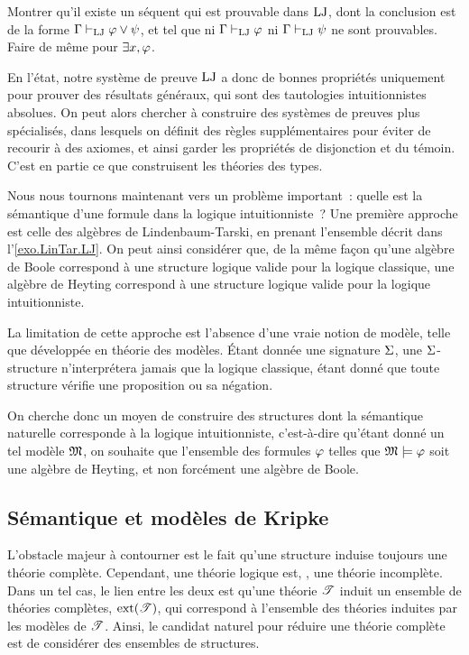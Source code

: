 \begin{exercise}
  Montrer qu'il existe un séquent qui est prouvable dans $\operatorname{LJ}$, dont la
  conclusion est de la forme $\Gamma\vdash_{\operatorname{LJ}}\varphi\lor \psi$, et tel que
  ni $\Gamma\vdash_{\operatorname{LJ}}\varphi$ ni $\Gamma\vdash_{\operatorname{LJ}}\psi$ ne sont prouvables.
  Faire de même pour $\exists x, \varphi$.
\end{exercise}

En l'état, notre système de preuve $\operatorname{LJ}$ a donc de bonnes propriétés uniquement
pour prouver des résultats généraux, qui sont des tautologies intuitionnistes
absolues. On peut alors chercher à construire des systèmes de preuves plus
spécialisés, dans lesquels on définit des règles supplémentaires pour éviter
de recourir à des axiomes, et ainsi garder les propriétés de disjonction et du
témoin. C'est en partie ce que construisent les théories des types.

Nous nous tournons maintenant vers un problème important~: quelle est la
sémantique d'une formule dans la logique intuitionniste~? Une première approche
est celle des algèbres de Lindenbaum-Tarski, en prenant l'ensemble décrit dans
l'\cref{exo.LinTar.LJ}. On peut ainsi considérer que, de la même façon qu'une
algèbre de Boole correspond à une structure logique valide pour la logique
classique, une algèbre de Heyting correspond à une structure logique valide
pour la logique intuitionniste.

La limitation de cette approche est l'absence d'une vraie notion de modèle,
telle que développée en théorie des modèles. \'Etant donnée une signature
$\Sigma$, une $\Sigma$-structure n'interprétera jamais que la logique classique,
étant donné que toute structure vérifie une proposition ou sa négation.

On cherche donc un moyen de construire des structures dont la sémantique
naturelle corresponde à la logique intuitionniste, c'est-à-dire qu'étant donné
un tel modèle $\mathfrak{M}$, on souhaite que l'ensemble des formules $\varphi$
telles que $\mathfrak{M}\models \varphi$ soit une algèbre de Heyting, et non forcément
une algèbre de Boole.

\subsection{Sémantique et modèles de Kripke}

L'obstacle majeur à contourner est le fait qu'une structure induise toujours une
théorie complète. Cependant, une théorie logique est, ,
une théorie incomplète. Dans un tel cas, le lien entre les deux est qu'une
théorie $\mathscr T$ induit un ensemble de théories complètes, $\operatorname{ext}(\mathscr T)$, qui
correspond à l'ensemble des théories induites par les modèles de $\mathscr T$. Ainsi,
le candidat naturel pour réduire une théorie complète est de considérer des
ensembles de structures.

